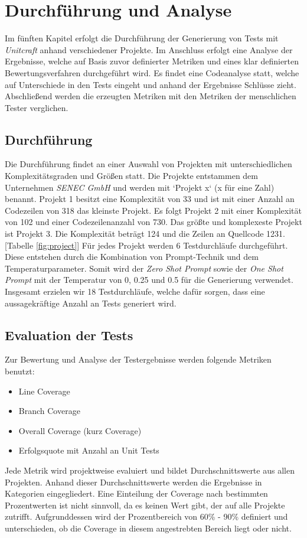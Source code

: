 \chapter{Durchführung und Analyse}
Im fünften Kapitel erfolgt die Durchführung der Generierung von Tests mit \textit{Unitcraft} anhand verschiedener Projekte. Im Anschluss erfolgt eine Analyse der Ergebnisse, welche auf Basis zuvor definierter Metriken und eines klar definierten Bewertungsverfahren durchgeführt wird. Es findet eine Codeanalyse statt, welche auf Unterschiede in den Tests eingeht und anhand der Ergebnisse Schlüsse zieht. Abschließend werden die erzeugten Metriken mit den Metriken der menschlichen Tester verglichen.

\section{Durchführung}
Die Durchführung findet an einer Auswahl von Projekten mit unterschiedlichen Komplexitätsgraden und Größen statt. Die Projekte entstammen dem Unternehmen \textit{SENEC GmbH} und werden mit `Projekt x` (x für eine Zahl) benannt. Projekt 1 besitzt eine Komplexität von 33 und ist mit einer Anzahl an Codezeilen von 318 das kleinste Projekt. Es folgt Projekt 2 mit einer Komplexität von 102 und einer Codezeilenanzahl von 730. Das größte und komplexeste Projekt ist Projekt 3. Die Komplexität beträgt 124 und die Zeilen an Quellcode 1231. [Tabelle \ref{fig:project}]
Für jedes Projekt werden 6 Testdurchläufe durchgeführt. Diese entstehen durch die Kombination von Prompt-Technik und dem Temperaturparameter. Somit wird der \textit{Zero Shot Prompt} sowie der \textit{One Shot Prompt} mit der Temperatur von 0, 0.25 und 0.5 für die Generierung verwendet. Insgesamt erzielen wir 18 Testdurchläufe, welche dafür sorgen, dass eine aussagekräftige Anzahl an Tests generiert wird.

\section{Evaluation der Tests}
Zur Bewertung und Analyse der Testergebnisse werden folgende Metriken benutzt: 
\begin{itemize}
    \setlength{\parskip}{1pt}
    \item Line Coverage
    \item Branch Coverage
    \item Overall Coverage (kurz Coverage)
    \item Erfolgsquote mit Anzahl an Unit Tests
\end{itemize}
Jede Metrik wird projektweise evaluiert und bildet Durchschnittswerte aus allen Projekten. Anhand dieser Durchschnittswerte werden die Ergebnisse in Kategorien eingegliedert. Eine Einteilung der Coverage nach bestimmten Prozentwerten ist nicht sinnvoll, da es keinen Wert gibt, der auf alle Projekte zutrifft. Aufgrunddessen wird der Prozentbereich von 60\% - 90\% definiert und unterschieden, ob die Coverage in diesem angestrebten Bereich liegt oder nicht. \cite{WhatReasonableCode}

